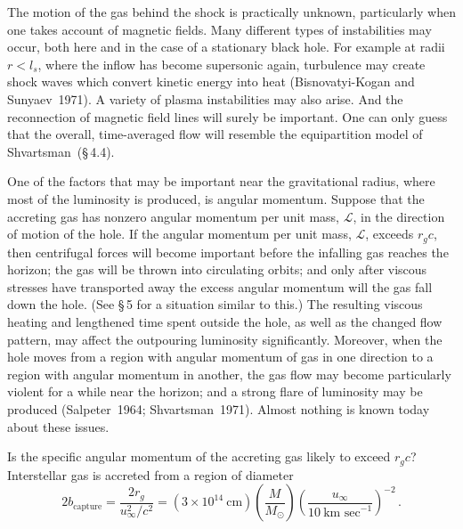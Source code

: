 The motion of the gas behind the shock is practically unknown, particularly
when one takes account of magnetic fields. Many different types of instabilities
may occur, both here and in the case of a stationary black hole. For example at
radii $r < l_s$, where the inflow has become supersonic again, turbulence may
create shock waves which convert kinetic energy into heat (Bisnovatyi-Kogan and
Sunyaev~1971). A variety of plasma instabilities may also arise. And the
reconnection of magnetic field lines will surely be important. One can only guess that
the overall, time-averaged flow will resemble the equipartition model of
Shvartsman~(\S\,4.4).

One of the factors that may be important near the gravitational radius, where
most of the luminosity is produced, is angular momentum. Suppose that the accreting
gas has nonzero angular momentum per unit mass, $\mathscr{L}$, in the direction of motion
of the hole. If the angular momentum per unit mass, $\mathscr{L}$, exceeds
$r_g c$, then centrifugal forces will become important before the infalling gas reaches
the horizon; the gas will be thrown into circulating orbits; and only after viscous
stresses have transported away the excess angular momentum will the gas fall
down the hole. (See \S\,5 for a situation similar to this.) The resulting viscous
heating and lengthened time spent outside the hole, as well as the changed flow
pattern, may affect the outpouring luminosity significantly. Moreover, when the
hole moves from a region with angular momentum of gas in one direction to a
region with angular momentum in another, the gas flow may become particularly
violent for a while near the horizon; and a strong flare of luminosity may be
produced (Salpeter~1964; Shvartsman~1971). Almost nothing is known today
about these issues.

Is the specific angular momentum of the accreting gas likely to exceed $r_g c$?
Interstellar gas is accreted from a region of diameter
%
\begin{equation}
2b_\text{capture} = \frac{2r_g}{u_\infty^2/c^2}
= (3 \times 10^{14}~\text{cm})
\left(\frac{M}{M_\odot}\right)
\left(\frac{u_\infty}{10~\text{km~sec}^{-1}}\right)^{-2}\,.
\tag{4.8.7}
\end{equation}

